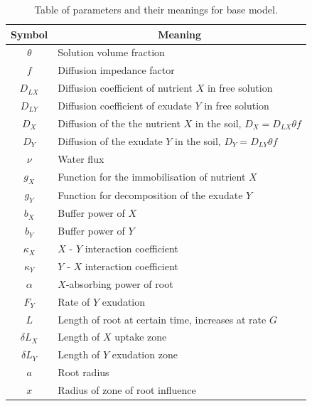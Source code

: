 \documentclass[11pt]{article}
\numberwithin{equation}{section}
\begin{document}
\begin{table}[!htb]
\begin{center}
\fontsize{9.5}{7}\selectfont
\setlength{\tabcolsep}{5.pt}
\def\arraystretch{2.0}
\begin{tabular}{cl}
\toprule
    \bf Symbol & \multicolumn{1}{c}{\bf Meaning}
    \\ \midrule
    $\theta$ & Solution volume fraction \\
    $f$ & Diffusion impedance factor \\
    $D_{LX}$ & Diffusion coefficient of nutrient $X$  in free solution \\
    $D_{LY}$ & Diffusion coefficient of exudate $Y$  in free solution \\
    $D_X$ & Diffusion of the the nutrient $X$ in the soil, $D_X = D_{LX} \theta f$  \\  
	$D_{Y}$ &  Diffusion of the exudate $Y$ in the soil, $D_{Y} = D_{LY} \theta f$  \\ 
	$\nu$ & Water flux\\
	$g_X$ & Function for the immobilisation of nutrient $X$ \\
	$g_{Y}$ & Function for decomposition of the exudate $Y$ \\
	$b_X$ & Buffer power of $X$ \\
	$b_{Y}$ & Buffer power of $Y$ \\
	$\kappa_{X}$ & $X$ - $Y$ interaction coefficient \\
	$\kappa_{Y}$ & $Y$ - $X$ interaction coefficient\\
	$\alpha $ & $X$-absorbing power of root \\
	$F_{Y} $ & Rate of $Y$ exudation  \\
	$L$ & Length of root at certain time, increases at rate $G$ \\
	$\delta L_{X}$ & Length of $X$ uptake zone \\
	$\delta L_{Y}$ & Length of $Y$ exudation zone  \\	
	$a$ & Root radius \\
	$x$ & Radius of zone of root influence \\
\bottomrule
\end{tabular}
\caption{Table of parameters and their meanings for base model.
\label{t:First-model-params}}
\end{center}
\end{table}
\end{document}
